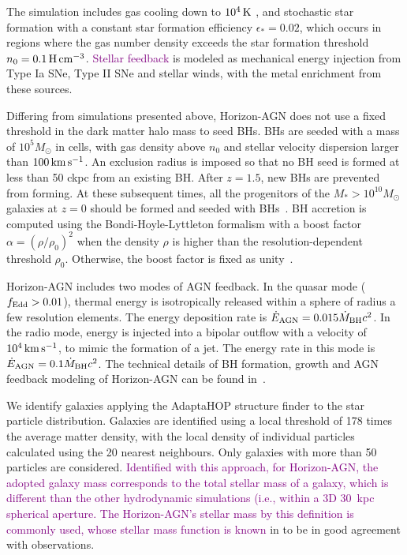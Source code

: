 \documentclass[twocolumn]{aastex631}
\newcommand{\todo}[1]{\textcolor{red}{[{\bf TODO}: #1]}}
\newcommand{\red}[1]{\textcolor{purple}{#1}}
\def\smass{{$M_*$}}
\begin{document}
The simulation includes gas cooling down to $10^4\, \rm K$ \citep{sutherland&dopita93}, and stochastic star formation with a constant star formation efficiency $\epsilon_*=0.02$, which occurs in regions where the gas number density exceeds the star formation threshold $n_0 = 0.1\,\rm H\, cm^{-3}$. %
\red{Stellar feedback} is modeled as mechanical energy injection from Type Ia SNe, Type II SNe and stellar winds, with the metal enrichment from these sources.

Differing from simulations presented above, Horizon-AGN does not use a fixed threshold in the dark matter halo mass to seed BHs.  BHs are seeded with a mass of $10^5 M_\odot$ in cells, with gas density above $n_0$ and stellar velocity dispersion larger than $100 \,\rm km\,s^{-1}$. An exclusion radius is imposed so that no BH seed is formed at less than 50 ckpc from an existing BH. After $z = 1.5$, new BHs are prevented from forming. At these subsequent times, all the progenitors of the \smass$>10^{10} M_{\odot}$ galaxies at $z = 0$ should be formed and seeded with BHs~\citep{2016MNRAS.460.2979V}.  BH accretion is computed using the Bondi-Hoyle-Lyttleton formalism with a boost factor $\alpha = (\rho/\rho_0)^2$ when the density $\rho$ is higher than the resolution-dependent threshold $\rho_0$. Otherwise, the boost factor is fixed as unity~\citep{2009MNRAS.398...53B}.

Horizon-AGN includes two modes of AGN feedback. In the quasar mode ($f_{\rm Edd}>0.01$), thermal energy is isotropically released within a sphere of radius a few resolution elements. The energy deposition rate is $\dot{E}_{\rm AGN} = 0.015 \dot{M}_{\rm BH} c^2$. In the radio mode, energy is injected into a bipolar  outflow  with  a  velocity  of  $10^4\,\rm km\,s^{-1}$, to  mimic the  formation  of  a  jet.  The  energy  rate  in  this  mode is $\dot{E}_{\rm AGN} = 0.1 \dot{M}_{\rm BH} c^2$.  The  technical  details  of  BH  formation,  growth  and AGN  feedback  modeling  of  Horizon-AGN  can be found in~\citet{2012MNRAS.420.2662D}.

We identify galaxies applying the AdaptaHOP structure finder \citep{Aubert+04,Tweed+09} to the star particle distribution.  Galaxies are identified using a local threshold of 178 times the average matter density, with the local density of individual particles calculated using the 20 nearest neighbours. Only galaxies with more than 50 particles are considered. \red{Identified with this approach, for Horizon-AGN, the adopted galaxy mass corresponds to the total stellar mass of a galaxy, which is different than the other hydrodynamic simulations (i.e., within a 3D 30~kpc spherical aperture. The Horizon-AGN's stellar mass by this definition is commonly used, whose stellar mass function is known} in \citet{2017MNRAS.467.4739K} to be in good agreement with observations.
\end{document}
